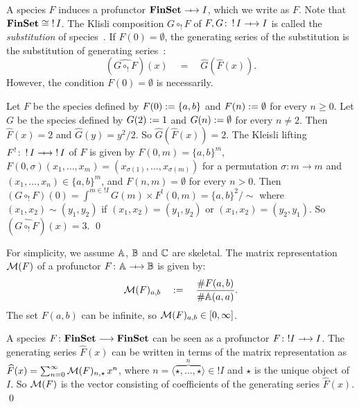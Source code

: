A species \( F \) induces a profunctor \( \FinSet \profarrow I \), which we write as \( F \).
Note that \( \mathbf{FinSet} \cong \mathop{!}I \).
The Klisli composition \( G \circ_! F \) of \( F, G \colon \mathop{!}I \profarrow I \) is called the \emph{substitution} of species~\cite{FioreSpecies}.
If \( F(0) = \emptyset \), the generating series of the substitution is the substitution of generating series~\cite[Lem???]{Joyal?}:
\begin{equation*}
    (\widehat{G \circ_! F})(x)
    \quad=\quad
    \widehat{G}(\widehat{F}(x)).
\end{equation*}
However, the condition \( F(0) = \emptyset \) is necessarily.
\begin{example}\label{eg:matrix:species-counterexample}
    Let \( F \) be the species defined by \( F(0) := \{ a, b \} \) and \( F(n) := \emptyset \) for every \( n \ge 0 \).
    Let \( G \) be the species defined by \( G(2) := 1 \) and \( G(n) := \emptyset \) for every \( n \neq 2 \).
    Then \( \widehat{F}(x) = 2 \) and \( \widehat{G}(y) = y^2/2 \).
    So \( \widehat{G}(\widehat{F}(x)) = 2 \).
    The Kleisli lifting \( F^! \colon \mathop{!}I \profarrow \mathop{!}I \) of \( F \) is given by \( F(0,m) = \{ a, b \}^m \), \( F(0, \sigma)(x_1,\dots,x_m) = (x_{\sigma(1)}, \dots, x_{\sigma(m)}) \) for a permutation \( \sigma \colon m \to m \) and \( (x_1,\dots,x_n) \in \{ a,b \}^m \), and \( F(n,m) = \emptyset \) for every \( n > 0 \).
    Then \( (G \circ_! F)(0) = \int^{m \in \mathop{!}I} G(m) \times F^!(0, m) = \{ a, b \}^2/{\sim} \) where \( (x_1,x_2) \sim (y_1,y_2) \) if \( (x_1,x_2) = (y_1,y_2) \) or \( (x_1,x_2) = (y_2,y_1) \).
    So \( (\widehat{G \circ_! F})(x) = 3 \).
    \qed
\end{example}


For simplicity, we assume \( \mathbb{A} \), \( \mathbb{B} \) and \( \mathbb{C} \) are skeletal.
The matrix representation \( \mathcal{M}({F}) \) of a profunctor \( F \colon \Grp \profarrow \Grpb \) is given by:
\begin{equation*}
    \mathcal{M}({F})_{a,b}
    \quad:=\quad
    \dfrac{\# F(a,b)}{\# \mathbb{A}(a,a)}.
\end{equation*}
The set \( F(a,b) \) can be infinite, so \( \mathcal{M}({F})_{a,b} \in [0, \infty] \).
\begin{remark}
    A species \( F \colon \mathbf{FinSet} \longrightarrow \mathbf{FinSet} \) can be seen as a profunctor \( F \colon {!}I \profarrow I \).
    The generating series \( \widehat{F}(x) \) can be written in terms of the matrix representation as \( \widehat{F}(x) = \sum_{n = 0}^{\infty} \mathcal{M}({F})_{n, \star}\, x^n \), where \( n = \langle \overbrace{\star, \dots, \star}^n \rangle \in {!}I \) and \( \star \) is the unique object of \( I \).
    So \( \mathcal{M}({F}) \) is the vector consisting of coefficients of the generating series \( \widehat{F}(x) \).
    \qed
\end{remark}

